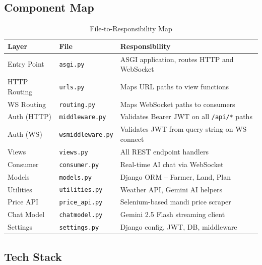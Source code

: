 \documentclass[11pt,a4paper]{article}
\begin{document}
\subsection{Component Map}

\begin{table}[H]
\centering
\begin{tabularx}{\textwidth}{l l X}
\toprule
\textbf{Layer} & \textbf{File} & \textbf{Responsibility} \\
\midrule
Entry Point    & \texttt{asgi.py}        & ASGI application, routes HTTP and WebSocket \\
HTTP Routing   & \texttt{urls.py}        & Maps URL paths to view functions \\
WS Routing     & \texttt{routing.py}     & Maps WebSocket paths to consumers \\
Auth (HTTP)    & \texttt{middleware.py}   & Validates Bearer JWT on all \texttt{/api/*} paths \\
Auth (WS)      & \texttt{wsmiddleware.py} & Validates JWT from query string on WS connect \\
Views          & \texttt{views.py}       & All REST endpoint handlers \\
Consumer       & \texttt{consumer.py}    & Real-time AI chat via WebSocket \\
Models         & \texttt{models.py}      & Django ORM -- Farmer, Land, Plan \\
Utilities      & \texttt{utilities.py}   & Weather API, Gemini AI helpers \\
Price API      & \texttt{price\_api.py}  & Selenium-based mandi price scraper \\
Chat Model     & \texttt{chatmodel.py}   & Gemini 2.5 Flash streaming client \\
Settings       & \texttt{settings.py}    & Django config, JWT, DB, middleware \\
\bottomrule
\end{tabularx}
\caption{File-to-Responsibility Map}
\end{table}

\subsection{Tech Stack}
\end{document}
